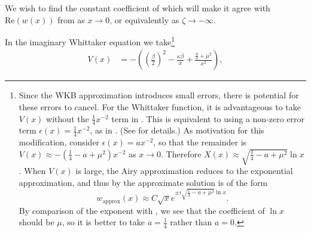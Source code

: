We wish to find the constant coefficient of  which will make it agree with $\textrm{Re}(w(x))$ from  as $x\to0$, or equivalently as $\zeta\to-\infty$. 

In the imaginary Whittaker equation  we take\footnote{\label{fn:modified-potential}Since the WKB approximation introduces small errors, there is potential for these errors to cancel. For the Whittaker function, it is advantageous to take $V(x)$ without the $\tfrac{1}{4}x^{-2}$ term in . This is equivalent to using a non-zero error term $\epsilon(x)=\tfrac{1}{4}x^{-2}$, as in . (See \cite{olver1997} for details.) As motivation for this modification, consider $\epsilon(x)=ax^{-2}$, so that the remainder is $V(x)\approx-(\tfrac{1}{4}-a+\mu^{2})x^{-2}$ as $x\to0$. Therefore $X(x)\approx\sqrt{\tfrac{1}{4}-a+\mu^{2}}\ln x$. When $V(x)$ is large, the Airy approximation reduces to the exponential approximation, and thus by  the approximate solution is of the form 
\[
w_{\mathrm{approx}}(x)\approx C\sqrt{x}e^{\pm i\sqrt{\tfrac{1}{4}-a+\mu^{2}}\ln x}.
\]
 By comparison of the exponent with , we see that the coefficient of $\ln x$ should be $\mu$, so it is better to take $a=\tfrac{1}{4}$ rather than $a=0$. } 
\begin{align*}
V(x) & =-\left(\left(\frac{\beta}{2}\right)^{2}-\frac{\kappa\beta}{x}+\frac{\tfrac{0}{4}+\mu^{2}}{x^{2}}\right),
\end{align*}

